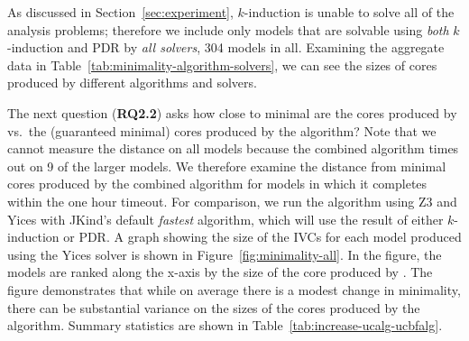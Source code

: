 As discussed in Section~\ref{sec:experiment}, $k$-induction is unable to solve all of the analysis problems; therefore we include only models that are solvable using {\em both} $k$-induction and PDR by {\em all solvers}, 304 models in all.  Examining the aggregate data in Table~\ref{tab:minimality-algorithm-solvers}, we can see the sizes of cores produced by different algorithms and solvers.







The next question (\textbf{RQ2.2}) asks how close to minimal are the
cores produced by \ucalg vs.\ the (guaranteed minimal) cores produced
by the \ucbfalg algorithm? Note that we cannot measure the distance on
all models because the combined algorithm times out on 9 of the larger
models. We therefore examine the distance from minimal cores produced
by the combined algorithm for models in which it completes within the
one hour timeout. For comparison, we run the \ucalg algorithm using Z3
and Yices with JKind's default {\em fastest} algorithm, which will use the
result of either $k$-induction or PDR. A graph showing the size of the
IVCs for each model produced using the Yices solver is shown in
Figure~\ref{fig:minimality-all}. In the figure, the models are ranked
along the x-axis by the size of the core produced by \ucbfalg. The
figure demonstrates that while on average there is a modest change in
minimality, there can be substantial variance on the sizes of the
cores produced by the \ucalg algorithm. Summary statistics are shown
in Table~\ref{tab:increase-ucalg-ucbfalg}.


